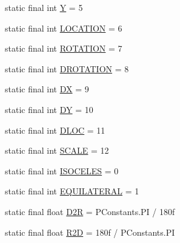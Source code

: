 \begin{DoxyCompactItemize}
static final int \hyperlink{interfacehype_1_1util_1_1_h_constants_aeb289bdf5e7b1285c682c96d5efa4216}{Y} = 5
\item 
static final int \hyperlink{interfacehype_1_1util_1_1_h_constants_a9c577d66297bafbc4f6994ef9911886d}{L\-O\-C\-A\-T\-I\-O\-N} = 6
\item 
static final int \hyperlink{interfacehype_1_1util_1_1_h_constants_a17bd722a38d738cf852feae8c3608e49}{R\-O\-T\-A\-T\-I\-O\-N} = 7
\item 
static final int \hyperlink{interfacehype_1_1util_1_1_h_constants_a9a003d3a606bf4c32f1f8557b7ef90a0}{D\-R\-O\-T\-A\-T\-I\-O\-N} = 8
\item 
static final int \hyperlink{interfacehype_1_1util_1_1_h_constants_a5997f9d92cb60752e7cce01550da3da3}{D\-X} = 9
\item 
static final int \hyperlink{interfacehype_1_1util_1_1_h_constants_aed933731959c48c64fde171d709f05c3}{D\-Y} = 10
\item 
static final int \hyperlink{interfacehype_1_1util_1_1_h_constants_a813b26a0383d5a4140050d191a211ece}{D\-L\-O\-C} = 11
\item 
static final int \hyperlink{interfacehype_1_1util_1_1_h_constants_a5acafe0ac39c97b6aac0aa2ea0ab1200}{S\-C\-A\-L\-E} = 12
\item 
static final int \hyperlink{interfacehype_1_1util_1_1_h_constants_a46aacafd0bfd088dd23ff151106674c3}{I\-S\-O\-C\-E\-L\-E\-S} = 0
\item 
static final int \hyperlink{interfacehype_1_1util_1_1_h_constants_a1d9dbd4ac52de3b1fc2feb6c234c747f}{E\-Q\-U\-I\-L\-A\-T\-E\-R\-A\-L} = 1
\item 
static final float \hyperlink{interfacehype_1_1util_1_1_h_constants_a5ed71fb4b47e5babb0bba63b4bb0c5fa}{D2\-R} = P\-Constants.\-P\-I / 180f
\item 
static final float \hyperlink{interfacehype_1_1util_1_1_h_constants_a7ce3b8de220fac7fcd9c35758912dc90}{R2\-D} = 180f / P\-Constants.\-P\-I
\end{DoxyCompactItemize}


